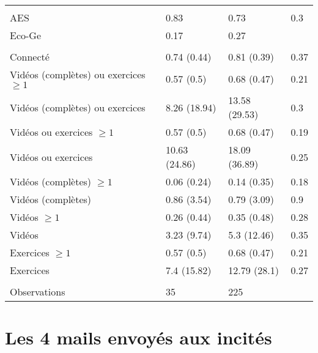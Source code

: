 \documentclass[
]{book}
\begin{document}
\begin{ThreePartTable}
\begin{longtable}[t]{llll}
\addlinespace[0.3em]
\multicolumn{4}{l}{\textbf{Filière}}\\
\hspace{1em}AES & 0.83 & 0.73 & 0.3\\
\hspace{1em}Eco-Ge & 0.17 & 0.27 & \\
\addlinespace[0.3em]
\multicolumn{4}{l}{\textbf{Plateforme}}\\
\hspace{1em}Connecté & 0.74 (0.44) & 0.81 (0.39) & 0.37\\
\hspace{1em}Vidéos (complètes) ou exercices $\geq 1$ & 0.57 (0.5) & 0.68 (0.47) & 0.21\\
\hspace{1em}Vidéos (complètes) ou exercices & 8.26 (18.94) & 13.58 (29.53) & 0.3\\
\hspace{1em}Vidéos ou exercices $\geq 1$ & 0.57 (0.5) & 0.68 (0.47) & 0.19\\
\hspace{1em}Vidéos ou exercices & 10.63 (24.86) & 18.09 (36.89) & 0.25\\
\hspace{1em}Vidéos (complètes) $\geq 1$ & 0.06 (0.24) & 0.14 (0.35) & 0.18\\
\hspace{1em}Vidéos (complètes) & 0.86 (3.54) & 0.79 (3.09) & 0.9\\
\hspace{1em}Vidéos $\geq 1$ & 0.26 (0.44) & 0.35 (0.48) & 0.28\\
\hspace{1em}Vidéos & 3.23 (9.74) & 5.3 (12.46) & 0.35\\
\hspace{1em}Exercices $\geq 1$ & 0.57 (0.5) & 0.68 (0.47) & 0.21\\
\hspace{1em}Exercices & 7.4 (15.82) & 12.79 (28.1) & 0.27\\
\addlinespace[0.3em]
\multicolumn{4}{l}{\textbf{ }}\\
\hspace{1em}Observations & 35 & 225 & \\*
\end{longtable}
\end{ThreePartTable}
\endgroup{}

\newpage
\setcounter{table}{0}
\setcounter{figure}{0}

\hypertarget{g20mails}{%
\section{Les 4 mails envoyés aux incités}\label{g20mails}}
\end{document}
